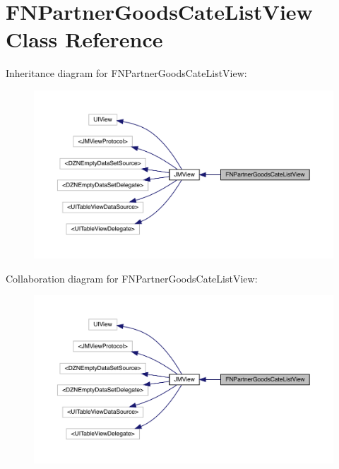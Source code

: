 \hypertarget{interface_f_n_partner_goods_cate_list_view}{}\section{F\+N\+Partner\+Goods\+Cate\+List\+View Class Reference}
\label{interface_f_n_partner_goods_cate_list_view}


Inheritance diagram for F\+N\+Partner\+Goods\+Cate\+List\+View\+:\nopagebreak
\begin{figure}[H]
\begin{center}
\leavevmode
\includegraphics[width=350pt]{interface_f_n_partner_goods_cate_list_view__inherit__graph}
\end{center}
\end{figure}


Collaboration diagram for F\+N\+Partner\+Goods\+Cate\+List\+View\+:\nopagebreak
\begin{figure}[H]
\begin{center}
\leavevmode
\includegraphics[width=350pt]{interface_f_n_partner_goods_cate_list_view__coll__graph}
\end{center}
\end{figure}
